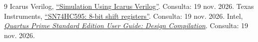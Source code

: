 \documentclass{replab}
\begin{document}
\begingroup\raggedright
\begin{thebibliography}{9}
 Icarus Verilog, \href{https://steveicarus.github.io/iverilog/usage/simulation.html}{``Simulation Using Icarus Verilog''}. Consulta: 19 nov. 2026.
 Texas Instruments, \href{https://www.ti.com/product/SN74HC595}{``SN74HC595: 8-bit shift registers''}. Consulta: 19 nov. 2026.
 Intel, \href{https://www.intel.com/programmable/technical-pdfs/683283.pdf}{\textit{Quartus Prime Standard Edition User Guide: Design Compilation}}. Consulta: 19 nov. 2026.
\end{thebibliography}
\endgroup
\end{document}

